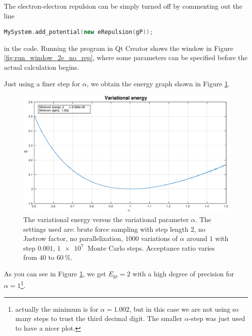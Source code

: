 \documentclass[a4paper,twoside,11pt]{book}
\begin{document}
The electron-electron repulsion can be simply turned off by commenting out the line
\begin{lstlisting}[language=cpp]
	MySystem.add_potential(new eRepulsion(gP));
\end{lstlisting}
in the code. Running the program in Qt Creator shows the window in Figure \ref{fig:run_window_2e_no_rep}, where some parameters can be specified before the actual calculation begins.

Just using a finer step for $\alpha$, we obtain the energy graph shown in Figure \ref{fig:2e_no_rep}.
\begin{figure}[H]
	\centering
	\includegraphics[width=\textwidth]{2e-norep}
	\caption{The variational energy versus the variational parameter $\alpha$. The settings used are: brute force sampling with step length 2, no Jastrow factor, no parallelization, $1000$ variations of $\alpha$ around $1$ with step $0.001$, $\SI{1e7}{}$ Monte Carlo steps. Acceptance ratio varies from $40$ to $\SI{60}{\percent}$.}
	\label{fig:2e_no_rep}
\end{figure}

As you can see in Figure \ref{fig:2e_no_rep}, we get $E_{\text{gs}} = 2$ with a high degree of precision for $\alpha=1$\footnote{actually the minimum is for $\alpha=1.002$, but in this case we are not using so many steps to trust the third decimal digit. The smaller $\alpha$-step was just used to have a nicer plot.}.
\end{document}
